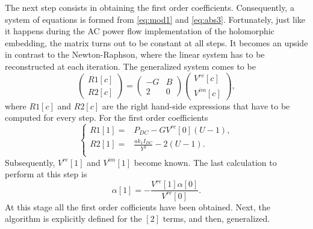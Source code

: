 \documentclass[conference]{IEEEtran}
\begin{document}
The next step consists in obtaining the first order coefficients. Consequently, a system of equations is formed from \eqref{eq:mod1} and \eqref{eq:abs3}. Fortunately, just like it happens during the AC power flow implementation of the holomorphic embedding, the matrix turns out to be constant at all steps. It becomes an upside in contrast to the Newton-Raphson, where the linear system has to be reconstructed at each iteration. The generalized system comes to be
\begin{equation}
  \begin{pmatrix}
    R1[c]\\
    R2[c]
  \end{pmatrix}
  =
  \begin{pmatrix}
    -G & B \\
    2 & 0
  \end{pmatrix}
  \begin{pmatrix}
    V^{re}[c]\\
    V^{im}[c]
  \end{pmatrix},
  \label{eq:sist1}
\end{equation}
where $R1[c]$ and $R2[c]$ are the right hand-side expressions that have to be computed for every step. For the first order coefficients
\begin{equation}
  \begin{cases}
    R1[1]=&P_{DC}-GV^{re}[0](U-1),\\
    R2[1]=&\frac{ak_1I_{DC}}{Y^2}-2(U-1).\\
  \end{cases}
  \label{eq:r1r21}
\end{equation}
Subsequently, $V^{re}[1]$ and $V^{im}[1]$ become known. The last calculation to perform at this step is
\begin{equation}
  \alpha[1]=-\frac{V^{re}[1]\alpha[0]}{V^{re}[0]}.
  \label{eq:alph1}
\end{equation}
At this stage all the first order cofficients have been obtained. Next, the algorithm is explicitly defined for the $[2]$ terms, and then, generalized. 
\end{document}

